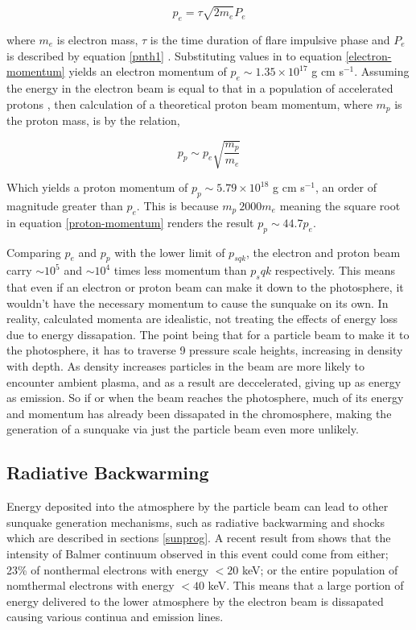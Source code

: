 \begin{equation}\label{electron-momentum}
p_e=\tau \sqrt{2m_e} P_{e}
\end{equation}

where $m_e$ is electron mass, $\tau$ is the time duration of flare impulsive phase and $P_{e}$ is described by equation \ref{pnth1} \citep{2015ApJ...807..102S}. Substituting values in to equation \ref{electron-momentum} yields an electron momentum of $p_e \sim 1.35{\times}10^{17}$ g cm s$^{-1}$. Assuming the energy in the electron beam is equal to that in a population of accelerated protons \citep{2000ApJ...542..513E}, then calculation of a theoretical proton beam momentum, where $m_p$ is the proton mass, is by the relation,

\begin{equation}\label{proton-momentum}
p_p \sim p_e \sqrt{\frac{m_p}{m_e}}
\end{equation}

Which yields a proton momentum of $p_p \sim 5.79{\times}10^18$ g cm s$^{-1}$, an order of magnitude greater than $p_e$. This is because $m_p ~ 2000m_e$ meaning the square root in equation \ref{proton-momentum} renders the result $p_p \sim 44.7p_e$. 

Comparing $p_{e}$ and $p_{p}$ with the lower limit of $p_{sqk}$, the electron and proton beam carry $\sim 10^{5}$ and $\sim 10^{4}$ times less momentum than $p_sqk$ respectively. This means that even if an electron or proton beam can make it down to the photosphere, it wouldn't have the necessary momentum to cause the sunquake on its own. In reality, calculated momenta are idealistic, not treating the effects of energy loss due to energy dissapation. The point being that for a particle beam to make it to the photosphere, it has to traverse 9 pressure scale heights, increasing in density with depth. As density increases particles in the beam are more likely to encounter ambient plasma, and as a result are deccelerated, giving up as energy as emission. So if or when the beam reaches the photosphere, much of its energy and momentum has already been dissapated in the chromosphere, making the generation of a sunquake via just the particle beam even more unlikely. \\

\subsection{Radiative Backwarming}
Energy deposited into the atmosphere by the particle beam can lead to other sunquake generation mechanisms, such as radiative backwarming and shocks which are described in sections \ref{sunprog}. A recent result from \cite{2016ApJ...816...88K} shows that the intensity of Balmer continuum observed in this event could come from either; 23\% of nonthermal electrons with energy $<20$ keV; or the entire population of nomthermal electrons with energy $<40$ keV. This means that a large portion of energy delivered to the lower atmosphere by the electron beam is dissapated causing various continua and emission lines. \\

